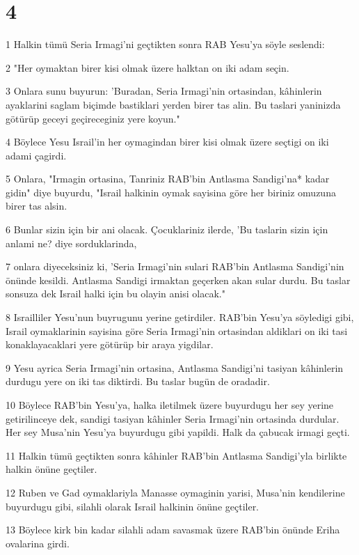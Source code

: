 \chapter{4}

\par 1 Halkin tümü Seria Irmagi'ni geçtikten sonra RAB Yesu'ya söyle seslendi:
\par 2 "Her oymaktan birer kisi olmak üzere halktan on iki adam seçin.
\par 3 Onlara sunu buyurun: 'Buradan, Seria Irmagi'nin ortasindan, kâhinlerin ayaklarini saglam biçimde bastiklari yerden birer tas alin. Bu taslari yaninizda götürüp geceyi geçireceginiz yere koyun."
\par 4 Böylece Yesu Israil'in her oymagindan birer kisi olmak üzere seçtigi on iki adami çagirdi.
\par 5 Onlara, "Irmagin ortasina, Tanriniz RAB'bin Antlasma Sandigi'na* kadar gidin" diye buyurdu, "Israil halkinin oymak sayisina göre her biriniz omuzuna birer tas alsin.
\par 6 Bunlar sizin için bir ani olacak. Çocuklariniz ilerde, 'Bu taslarin sizin için anlami ne? diye sorduklarinda,
\par 7 onlara diyeceksiniz ki, 'Seria Irmagi'nin sulari RAB'bin Antlasma Sandigi'nin önünde kesildi. Antlasma Sandigi irmaktan geçerken akan sular durdu. Bu taslar sonsuza dek Israil halki için bu olayin anisi olacak."
\par 8 Israilliler Yesu'nun buyrugunu yerine getirdiler. RAB'bin Yesu'ya söyledigi gibi, Israil oymaklarinin sayisina göre Seria Irmagi'nin ortasindan aldiklari on iki tasi konaklayacaklari yere götürüp bir araya yigdilar.
\par 9 Yesu ayrica Seria Irmagi'nin ortasina, Antlasma Sandigi'ni tasiyan kâhinlerin durdugu yere on iki tas diktirdi. Bu taslar bugün de oradadir.
\par 10 Böylece RAB'bin Yesu'ya, halka iletilmek üzere buyurdugu her sey yerine getirilinceye dek, sandigi tasiyan kâhinler Seria Irmagi'nin ortasinda durdular. Her sey Musa'nin Yesu'ya buyurdugu gibi yapildi. Halk da çabucak irmagi geçti.
\par 11 Halkin tümü geçtikten sonra kâhinler RAB'bin Antlasma Sandigi'yla birlikte halkin önüne geçtiler.
\par 12 Ruben ve Gad oymaklariyla Manasse oymaginin yarisi, Musa'nin kendilerine buyurdugu gibi, silahli olarak Israil halkinin önüne geçtiler.
\par 13 Böylece kirk bin kadar silahli adam savasmak üzere RAB'bin önünde Eriha ovalarina girdi.
